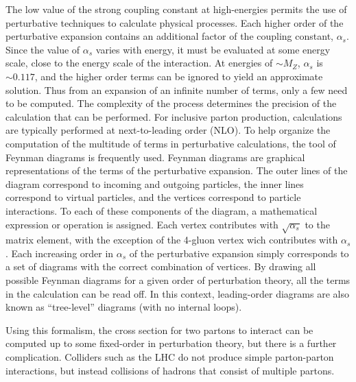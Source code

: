 The low value of the strong coupling constant at high-energies permits the use of perturbative techniques to calculate physical processes. Each higher order of the perturbative expansion contains an additional factor of the coupling constant, $\alpha_s$.  Since the value of $\alpha_s$ varies with energy, it must be evaluated at some energy scale, close to the energy scale of the interaction. At energies of $\sim M_Z$, $\alpha_s$ is $\sim 0.117$, and the higher order terms can be ignored to yield an approximate solution. Thus from an expansion of an infinite number of terms, only a few need to be computed.
 The complexity of the process determines the precision of the calculation that can be performed.  %
For inclusive parton production, calculations are typically performed at next-to-leading order (NLO).  %
To help organize the computation of the multitude of terms in perturbative calculations, the tool of Feynman diagrams is frequently used. Feynman diagrams are graphical representations of the terms of the perturbative expansion. The outer lines of the diagram correspond to incoming and outgoing particles, the inner lines correspond to virtual particles, and the vertices correspond to particle interactions. To each of these components of the diagram, a mathematical expression or operation is assigned. Each vertex  %
contributes with $\sqrt{\alpha_s}$ to the matrix element, with the exception of the 4-gluon vertex wich contributes with $\alpha_s$. Each increasing order in $\alpha_s$ of the perturbative expansion simply corresponds to a set of diagrams with the correct combination of vertices.  By drawing all possible Feynman diagrams for a given order of perturbation theory, all the terms in the calculation can be read off. In this context, leading-order diagrams are also known as ``tree-level'' diagrams (with no internal loops). 


Using this formalism, the cross section for two partons to interact can be computed up to some fixed-order in perturbation theory, but there is a further complication. Colliders such as the LHC do not produce simple parton-parton interactions, but instead collisions of hadrons that consist of multiple partons. 


